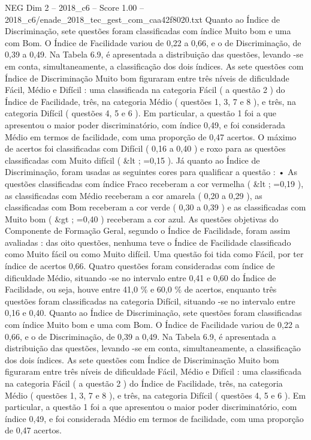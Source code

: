 \begin{textsample}{NEG Dim 2 – 2018\_c6 – Score 1.00 – 2018\_c6/enade\_2018\_tec\_gest\_com\_caa42f8020.txt}
Quanto ao Índice de Discriminação, sete questões foram classificadas com índice Muito bom e uma com Bom.
O Índice de Facilidade variou de 0,22 a 0,66, e o de Discriminação, de 0,39 a 0,49.
Na Tabela 6.9, é apresentada a distribuição das questões, levando -se em conta, simultaneamente, a classificação dos dois índices.
As sete questões com Índice de Discriminação Muito bom figuraram entre três níveis de dificuldade Fácil, Médio e Difícil : uma classificada na categoria Fácil ( a questão 2 ) do Índice de Facilidade, três, na categoria Médio ( questões 1, 3, 7 e 8 ), e três, na categoria Difícil ( questões 4, 5 e 6 ).
Em particular, a questão 1 foi a que apresentou o maior poder discriminatório, com índice 0,49, e foi considerada Médio em termos de facilidade, com uma proporção de 0,47 acertos.
O máximo de acertos foi classificadas com Difícil ( 0,16 a 0,40 ) e roxo para as questões classificadas com Muito difícil ( \&lt ; =0,15 ).
Já quanto ao Índice de Discriminação, foram usadas as seguintes cores para qualificar a questão : • As questões classificadas com índice Fraco receberam a cor vermelha ( \&lt ; =0,19 ), as classificadas com Médio receberam a cor amarela ( 0,20 a 0,29 ), as classificadas com Bom receberam a cor verde ( 0,30 a 0,39 ) e as classificadas com Muito bom ( \&gt ; =0,40 ) receberam a cor azul.
As questões objetivas do Componente de Formação Geral, segundo o Índice de Facilidade, foram assim avaliadas : das oito questões, nenhuma teve o Índice de Facilidade classificado como Muito fácil ou como Muito difícil.
Uma questão foi tida como Fácil, por ter índice de acertos 0,66.
Quatro questões foram consideradas com índice de dificuldade Médio, situando -se no intervalo entre 0,41 e 0,60 do Índice de Facilidade, ou seja, houve entre 41,0 \% e 60,0 \% de acertos, enquanto três questões foram classificadas na categoria Difícil, situando -se no intervalo entre 0,16 e 0,40.
Quanto ao Índice de Discriminação, sete questões foram classificadas com índice Muito bom e uma com Bom.
O Índice de Facilidade variou de 0,22 a 0,66, e o de Discriminação, de 0,39 a 0,49.
Na Tabela 6.9, é apresentada a distribuição das questões, levando -se em conta, simultaneamente, a classificação dos dois índices.
As sete questões com Índice de Discriminação Muito bom figuraram entre três níveis de dificuldade Fácil, Médio e Difícil : uma classificada na categoria Fácil ( a questão 2 ) do Índice de Facilidade, três, na categoria Médio ( questões 1, 3, 7 e 8 ), e três, na categoria Difícil ( questões 4, 5 e 6 ).
Em particular, a questão 1 foi a que apresentou o maior poder discriminatório, com índice 0,49, e foi considerada Médio em termos de facilidade, com uma proporção de 0,47 acertos.

\end{textsample}

